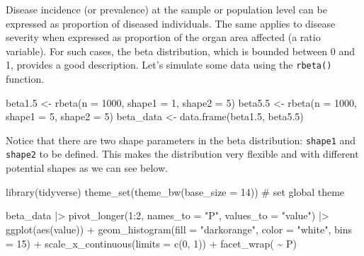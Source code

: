 \documentclass[
  letterpaper,
  DIV=11,
  numbers=noendperiod]{scrreprt}
\newenvironment{Shaded}{\begin{snugshade}}{\end{snugshade}}
\newcommand{\AttributeTok}[1]{\textcolor[rgb]{0.40,0.45,0.13}{#1}}
\newcommand{\CommentTok}[1]{\textcolor[rgb]{0.37,0.37,0.37}{#1}}
\newcommand{\DecValTok}[1]{\textcolor[rgb]{0.68,0.00,0.00}{#1}}
\newcommand{\FloatTok}[1]{\textcolor[rgb]{0.68,0.00,0.00}{#1}}
\newcommand{\FunctionTok}[1]{\textcolor[rgb]{0.28,0.35,0.67}{#1}}
\newcommand{\NormalTok}[1]{\textcolor[rgb]{0.00,0.23,0.31}{#1}}
\newcommand{\OtherTok}[1]{\textcolor[rgb]{0.00,0.23,0.31}{#1}}
\newcommand{\SpecialCharTok}[1]{\textcolor[rgb]{0.37,0.37,0.37}{#1}}
\newcommand{\StringTok}[1]{\textcolor[rgb]{0.13,0.47,0.30}{#1}}
\begin{document}
Disease incidence (or prevalence) at the sample or population level can
be expressed as proportion of diseased individuals. The same applies to
disease severity when expressed as proportion of the organ area affected
(a ratio variable). For such cases, the beta distribution, which is
bounded between 0 and 1, provides a good description. Let's simulate
some data using the \texttt{rbeta()} function.

\begin{Shaded}
\begin{Highlighting}[]
\NormalTok{beta1}\FloatTok{.5} \OtherTok{\textless{}{-}} \FunctionTok{rbeta}\NormalTok{(}\AttributeTok{n =} \DecValTok{1000}\NormalTok{, }\AttributeTok{shape1 =} \DecValTok{1}\NormalTok{, }\AttributeTok{shape2 =} \DecValTok{5}\NormalTok{)}
\NormalTok{beta5}\FloatTok{.5} \OtherTok{\textless{}{-}} \FunctionTok{rbeta}\NormalTok{(}\AttributeTok{n =} \DecValTok{1000}\NormalTok{, }\AttributeTok{shape1 =} \DecValTok{5}\NormalTok{, }\AttributeTok{shape2 =} \DecValTok{5}\NormalTok{)}
\NormalTok{beta\_data }\OtherTok{\textless{}{-}} \FunctionTok{data.frame}\NormalTok{(beta1}\FloatTok{.5}\NormalTok{, beta5}\FloatTok{.5}\NormalTok{)}
\end{Highlighting}
\end{Shaded}

Notice that there are two shape parameters in the beta distribution:
\texttt{shape1} and \texttt{shape2} to be defined. This makes the
distribution very flexible and with different potential shapes as we can
see below.

\begin{Shaded}
\begin{Highlighting}[]
\FunctionTok{library}\NormalTok{(tidyverse)}
\FunctionTok{theme\_set}\NormalTok{(}\FunctionTok{theme\_bw}\NormalTok{(}\AttributeTok{base\_size =} \DecValTok{14}\NormalTok{)) }\CommentTok{\# set global theme}

\NormalTok{beta\_data }\SpecialCharTok{|\textgreater{}}
  \FunctionTok{pivot\_longer}\NormalTok{(}\DecValTok{1}\SpecialCharTok{:}\DecValTok{2}\NormalTok{, }\AttributeTok{names\_to =} \StringTok{"P"}\NormalTok{,}
               \AttributeTok{values\_to =} \StringTok{"value"}\NormalTok{) }\SpecialCharTok{|\textgreater{}}
  \FunctionTok{ggplot}\NormalTok{(}\FunctionTok{aes}\NormalTok{(value)) }\SpecialCharTok{+}
  \FunctionTok{geom\_histogram}\NormalTok{(}\AttributeTok{fill =} \StringTok{"darkorange"}\NormalTok{,}
                 \AttributeTok{color =} \StringTok{"white"}\NormalTok{,}
                 \AttributeTok{bins =} \DecValTok{15}\NormalTok{) }\SpecialCharTok{+}
  \FunctionTok{scale\_x\_continuous}\NormalTok{(}\AttributeTok{limits =} \FunctionTok{c}\NormalTok{(}\DecValTok{0}\NormalTok{, }\DecValTok{1}\NormalTok{)) }\SpecialCharTok{+}
  \FunctionTok{facet\_wrap}\NormalTok{( }\SpecialCharTok{\textasciitilde{}}\NormalTok{ P) }
\end{Highlighting}
\end{Shaded}
\end{document}
